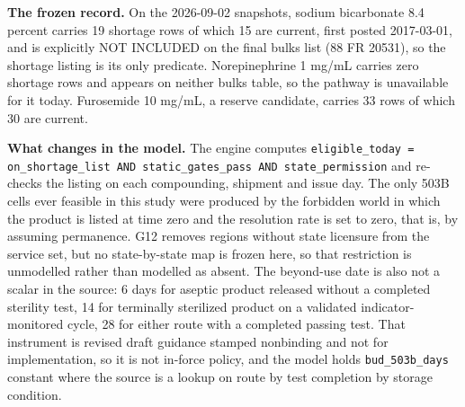\textbf{The frozen record.} On the 2026-09-02 snapshots, sodium bicarbonate 8.4 percent carries 19
shortage rows of which 15 are current, first posted 2017-03-01, and is explicitly NOT INCLUDED on
the final bulks list (88 FR 20531), so the shortage listing is its only predicate. Norepinephrine
1 mg/mL carries zero shortage rows and appears on neither bulks table, so the pathway is
unavailable for it today. Furosemide 10 mg/mL, a reserve candidate, carries 33 rows of which 30
are current.

\textbf{What changes in the model.} The engine computes
\texttt{eligible\_today = on\_shortage\_list AND static\_gates\_pass AND state\_permission} and
re-checks the listing on each compounding, shipment and issue day. The only 503B cells ever
feasible in this study were produced by the forbidden world in which the product is listed at time
zero and the resolution rate is set to zero, that is, by assuming permanence. G12 removes regions
without state licensure from the service set, but no state-by-state map is frozen here, so that
restriction is unmodelled rather than modelled as absent. The beyond-use date is also not a scalar
in the source: 6 days for aseptic product released without a completed sterility test, 14 for
terminally sterilized product on a validated indicator-monitored cycle, 28 for either route with a
completed passing test. That instrument is revised draft guidance stamped nonbinding and not for
implementation, so it is not in-force policy, and the model holds \texttt{bud\_503b\_days} constant
where the source is a lookup on route by test completion by storage condition.

